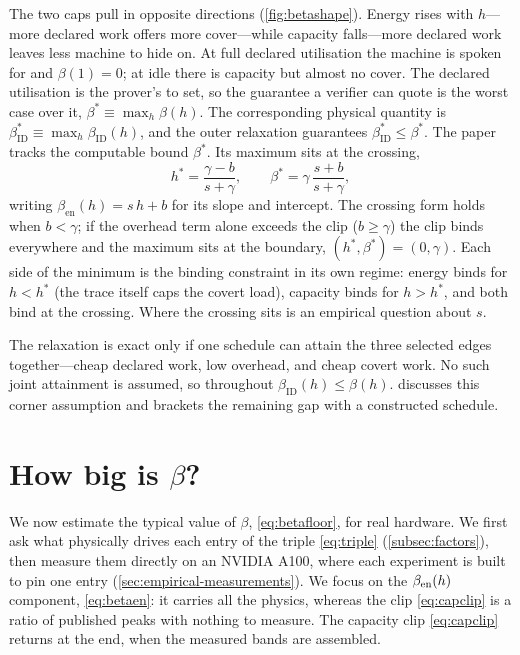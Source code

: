 \documentclass{article}
\theoremstyle{plain}
\theoremstyle{definition}
\theoremstyle{remark}
\begin{document}
The two caps pull in opposite directions (\cref{fig:betashape}). Energy
rises with $h$---more declared work offers more cover---while capacity
falls---more
declared work leaves less machine to hide on. At full declared utilisation
the machine is spoken for and $\beta(1) = 0$; at idle there
is capacity but almost no cover. The declared utilisation is the prover's to
set, so the guarantee a verifier can quote is the worst case over it,
$\beta^{*} \equiv \max_h \beta(h)$. The corresponding physical quantity is
$\beta_{\mathrm{ID}}^{*} \equiv \max_h \beta_{\mathrm{ID}}(h)$, and the
outer relaxation guarantees $\beta_{\mathrm{ID}}^{*} \leq \beta^{*}$.
The paper tracks the computable bound $\beta^{*}$. Its maximum sits at the crossing,
\begin{equation}
	h^{*} = \frac{\gamma - b}{s + \gamma}, \qquad
	\beta^{*} = \gamma\,\frac{s + b}{s + \gamma},
	\label{eq:betaworst}
\end{equation}
writing $\beta_{\mathrm{en}}(h) = s\,h + b$ for its slope and intercept. The crossing form
holds when $b < \gamma$; if the overhead term alone exceeds the clip
($b \ge \gamma$) the clip binds everywhere and the maximum sits at the
boundary, $(h^{*}, \beta^{*}) = (0, \gamma)$. Each side of the
minimum is the binding constraint in its own regime: energy binds for
$h < h^{*}$ (the trace itself caps the covert load), capacity binds for
$h > h^{*}$, and both bind at the crossing. Where the crossing sits is an
empirical question about $s$.

The relaxation is exact only if one schedule can attain the three selected
edges together---cheap declared work, low overhead, and cheap covert work.
No such joint attainment is assumed, so throughout
$\beta_{\mathrm{ID}}(h) \leq \beta(h)$.  discusses this
corner assumption and brackets the remaining gap with a constructed schedule.

\section{How big is \texorpdfstring{$\beta$}{beta}?}
\label{sec:howbig}

We now estimate the typical value of $\beta$, \cref{eq:betafloor}, for real hardware. We first ask what physically drives each entry of the triple \cref{eq:triple}
(\cref{subsec:factors}), then measure them directly on an NVIDIA A100, where
each experiment is built to pin one entry
(\cref{sec:empirical-measurements}). We focus on the $\beta_{\rm en}(h)$ component, \cref{eq:betaen}: it carries all
the physics, whereas the clip \cref{eq:capclip} is a ratio of published peaks
with nothing to measure. The capacity clip \cref{eq:capclip}
returns at the end, when the measured bands are assembled.
\end{document}
